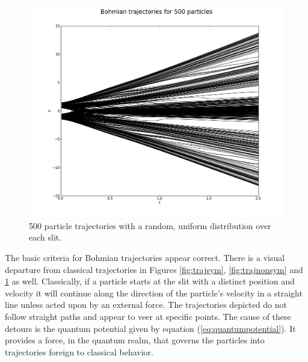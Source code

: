 \documentclass[10pt, reqno]{article}
\begin{document}
  \begin{figure}[!ht]
    \centerline{\includegraphics[scale=.5]{./imgs/500-bohmian-trajectories-693872239e5414e4.png}}
    \caption{
      500 particle trajectories with a random, uniform distribution over each slit.
    }
    \label{fig:trajnorm}
  \end{figure}
  \nocite{philippidis}

  The basic criteria for Bohmian trajectories appear correct.
  There is a visual departure from classical trajectories in Figures \ref{fig:trajsym}, \ref{fig:trajnonsym} and \ref{fig:trajnorm} as well.
  Classically, if a particle starts at the slit with a distinct position and velocity it will continue along the direction of the
    particle's velocity in a straight line unless acted upon by an external force.
  The trajectories depicted do not follow straight paths and appear to veer at specific points.
  The cause of these detours is the quantum potential given by equation (\ref{eq:quantumpotential}).
  It provides a force, in the quantum realm, that governs the particles into trajectories foreign to classical behavior.
\end{document}
